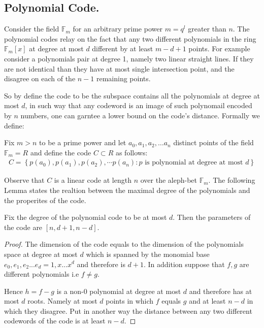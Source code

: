 \subsection{Polynomial Code.} Consider the field $\mathbb{F}_{m}$ for an arbitrary prime power $m=q^{l}$ greater than $n$. The polynomial codes relay on the fact that any two different polynomials in the ring $\mathbb{F}_{m}\left[ x \right]$ at degree at most $d$ different by at least $m - d + 1$ points. For example consider a polynomials pair at degree 1, namely two linear straight lines. If they are not identical than they have at most single intersection point, and the disagree on each of the $n-1$ remaining points.  

So by define the code to be the subspace contains all the polynomials at degree at most $d$, in such way that any codeword is an image of such polynomail encoded by $n$ numbers, one can garntee a lower bound on the code's distance. Formally we define:     
\begin{definition}
  Fix $m > n $ to be a prime power and let $a_{0},a_{1},a_{2},\ldots a_{n}$ distinct points of the field $\mathbb{F}_{m} = R$  and define the code $C \subset R $ as follows:  
  \begin{equation*}
    \begin{split}
      C = \left\{p\left(a_{0}\right),p\left(a_{1}\right),p\left(a_{2}\right),\cdots p\left(a_{n}\right) : p \text{ is polynomial at degree at most } d \right\}
    \end{split}
  \end{equation*}
\end{definition}
Observe that $C$ is a linear code at length $n$ over the aleph-bet $\mathbb{F}_{m}$. The following Lemma states the realtion between the maximal degree of the polynomials and the properites of the code.   
\begin{lemma}
  Fix the degree of the polynomial code to be at most $d$. Then the parameters of the code are $[n,d + 1, n - d]$.  
  \label{polycode}
\end{lemma}
\begin{proof}
  The dimension of the code equals to the dimension of the polynomials space at degree at most $d$ which is spanned by the monomial base $e_{0}, e_{1}, e_{2} ... e_{d} = 1, x ... x^{d}$ and therefore is $d+1$. In addition suppose that $f,g$ are different polynomials i.e $f\neq g$.

  Hence $h = f-g$ is a non-$0$ polynomial at degree at most $d$ and therefore has at most $d$ roots. Namely at most $d$ points in which $f$ equals $g$ and at least $n-d$ in which they disagree. Put in another way the distance between any two different codewords of the code is at least $n-d$.  
\end{proof}

